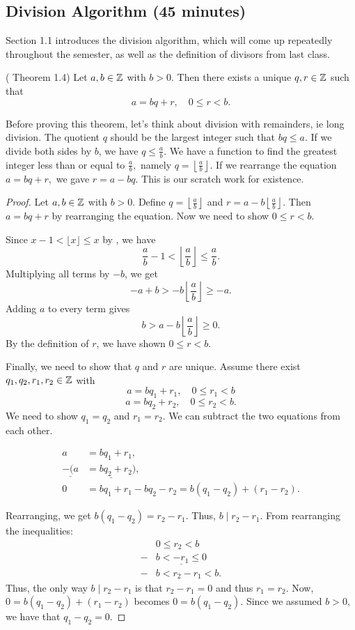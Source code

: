 \documentclass{ximera}
\begin{document}
\subsection{Division Algorithm (45 minutes)}
Section 1.1 introduces the division algorithm, which will come up repeatedly throughout the semester, as well as the definition of divisors from last class.

\begin{thm*}\label{div-alg}( Theorem 1.4)
 Let $a,b\in\mathbb Z$ with $b>0$. Then there exists a unique $q,r\in\mathbb Z$ such that \[a=bq+r, \quad 0\leq r <b.\]
\end{thm*}

Before proving this theorem, let's think about division with remainders, ie long division. The quotient $q$ should be the largest integer such that $bq\leq a$. If we divide both sides by $b$, we have $q\leq\frac{a}{b}$. We have a function to find the greatest integer less than or equal to $\frac{a}{b},$ namely $q=\left\lfloor\frac{a}{b}\right\rfloor$. If we rearrange the equation $a=bq+r,$ we gave $r=a-bq$. This is our scratch work for existence.

\begin{proof} Let $a,b\in\mathbb Z$ with $b>0$.
Define $q=\left\lfloor\frac{a}{b}\right\rfloor$ and $r=a-b\left\lfloor\frac{a}{b}\right\rfloor$. Then $a=bq+r$ by rearranging the equation. 
Now we need to show $0\leq r<b$. 

Since $x-1<\lfloor x\rfloor\leq x$ by , we have \[\frac{a}{b}-1<\left\lfloor\frac{a}{b}\right\rfloor\leq\frac{a}{b}.\] 
Multiplying all terms by $-b$, we get 
 \[-a+b>-b\left\lfloor\frac{a}{b}\right\rfloor\geq-a.\]
 Adding $a$ to every term gives \[b>a-b\left\lfloor\frac{a}{b}\right\rfloor\geq 0.\] 
By the definition of $r$, we have shown $0\leq r <b$.

Finally, we need to show that $q$ and $r$ are unique.
Assume there exist $q_1,q_2,r_1,r_2\in\mathbb Z$ with \[a=bq_1+r_1, \quad 0\leq r_1<b\]
 \[a=bq_2+r_2, \quad 0\leq r_2<b.\]
 We need to show $q_1=q_2$ and $r_1=r_2$. We can subtract the two equations from each other. 
 
\begin{align*}
  a&=bq_1+r_1, \\
\underline{ -(a}&\underline{=bq_2+r_2)}, \\
 0&=bq_1+r_1-bq_2-r_2=b(q_1-q_2)+(r_1-r_2) . 
\end{align*}

Rearranging, we get $b(q_1-q_2)=r_2-r_1$. Thus, $b\mid r_2-r_1$. From rearranging the inequalities:
\begin{align*}
 & 0\leq r_2<b\\
- & \underline{b< -r_1\leq 0}\\
 -&b<r_2-r_1<b.
\end{align*}
Thus, the only way $b\mid r_2-r_1$ is that $r_2-r_1=0$ and thus $r_1=r_2$. Now, $0=b(q_1-q_2)+(r_1-r_2)$ becomes $0=b(q_1-q_2)$. Since we assumed $b>0$, we have that $q_1-q_2=0$. 
\end{proof}
\end{document}
